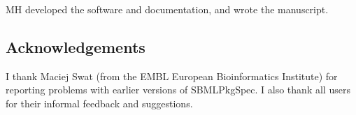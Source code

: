 \documentclass{bmcart}
\newcommand{\sbmlpkg}{SBMLPkgSpec}
\begin{document}
MH developed the software and documentation, and wrote the manuscript.

\subsection*{Acknowledgements}

I thank Maciej Swat (from the EMBL European Bioinformatics Institute) for reporting problems with earlier versions of \sbmlpkg.  I also thank all users for their informal feedback and suggestions.  






\end{document}

